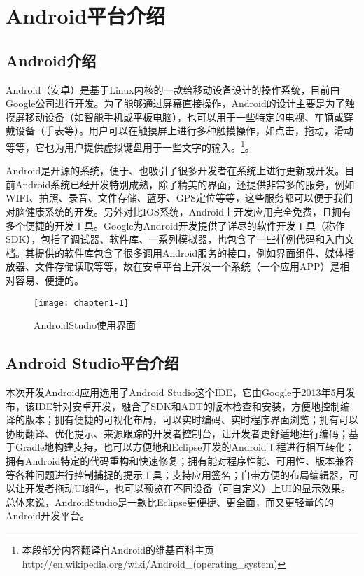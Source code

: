 \section{Android平台介绍}

\subsection{Android介绍}

Android（安卓）是基于Linux内核的一款给移动设备设计的操作系统，目前由Google公司进行开发。为了能够通过屏幕直接操作，Android的设计主要是为了触摸屏移动设备（如智能手机或平板电脑），也可以用于一些特定的电视、车辆或穿戴设备（手表等）。用户可以在触摸屏上进行多种触摸操作，如点击，拖动，滑动等等，它也为用户提供虚拟键盘用于一些文字的输入。\footnote{本段部分内容翻译自Android的维基百科主页http://en.wikipedia.org/wiki/Android\_(operating\_system)}。

Android是开源的系统，便于、也吸引了很多开发者在系统上进行更新或开发。目前Android系统已经开发特别成熟，除了精美的界面，还提供非常多的服务，例如WIFI、拍照、录音、文件存储、蓝牙、GPS定位等等，这些服务都可以便于我们对脑健康系统的开发。另外对比IOS系统，Android上开发应用完全免费，且拥有多个便捷的开发工具。Google为Android开发提供了详尽的软件开发工具（称作SDK），包括了调试器、软件库、一系列模拟器，也包含了一些样例代码和入门文档。其提供的软件库包含了很多调用Android服务的接口，例如界面组件、媒体播放器、文件存储读取等等，故在安卓平台上开发一个系统（一个应用APP）是相对容易、便捷的。

\begin{figure}[h]
  \centering
  \texttt{[image: chapter1-1]}
  \caption{AndroidStudio使用界面}
\end{figure}

\subsection{Android Studio平台介绍}

本次开发Android应用选用了Android Studio这个IDE，它由Google于2013年5月发布，该IDE针对安卓开发，融合了SDK和ADT的版本检查和安装，方便地控制编译的版本；拥有便捷的可视化布局，可以实时编码、实时程序界面浏览；拥有可以协助翻译、优化提示、来源跟踪的开发者控制台，让开发者更舒适地进行编码；基于Gradle地构建支持，也可以方便地和Eclipse开发的Android工程进行相互转化；拥有Android特定的代码重构和快速修复；拥有能对程序性能、可用性、版本兼容等各种问题进行控制捕捉的提示工具；支持应用签名；自带方便的布局编辑器，可以让开发者拖动UI组件，也可以预览在不同设备（可自定义）上UI的显示效果。总体来说，AndroidStudio是一款比Eclipse更便捷、更全面，而又更轻量的的Android开发平台。

